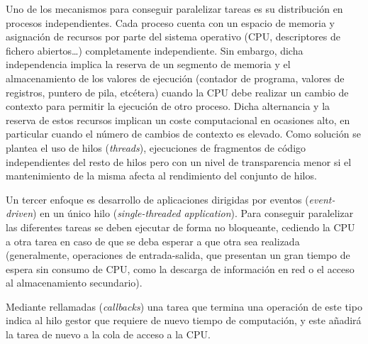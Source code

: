 Uno de los mecanismos para conseguir paralelizar tareas es su distribución en procesos independientes. Cada proceso cuenta con un espacio de memoria y asignación de recursos por parte del sistema operativo (CPU, descriptores de fichero abiertos\dots) completamente independiente. Sin embargo, dicha independencia implica la reserva de un segmento de memoria y el almacenamiento de los valores de ejecución (contador de programa, valores de registros, puntero de pila, etcétera) cuando la CPU debe realizar un cambio de contexto para permitir la ejecución de otro proceso. Dicha alternancia y la reserva de estos recursos implican un coste computacional en ocasiones alto, en particular cuando el número de cambios de contexto es elevado. Como solución se plantea el uso de hilos (\textit{threads}), ejecuciones de fragmentos de código independientes del resto de hilos pero con un nivel de transparencia menor si el mantenimiento de la misma afecta al rendimiento del conjunto de hilos.

\label{teoria:singlethread}
Un tercer enfoque es desarrollo de aplicaciones dirigidas por eventos (\textit{event-driven}) en un único hilo (\textit{single-threaded application}). Para conseguir paralelizar las diferentes tareas se deben ejecutar de forma no bloqueante, cediendo la CPU a otra tarea en caso de que se deba esperar a que otra sea realizada (generalmente, operaciones de entrada-salida, que presentan un gran tiempo de espera sin consumo de CPU, como la descarga de información en red o el acceso al almacenamiento secundario).


Mediante rellamadas (\textit{callbacks}) una tarea que termina una operación de este tipo indica al hilo gestor que requiere de nuevo tiempo de computación, y este añadirá la tarea de nuevo a la cola de acceso a la CPU.

